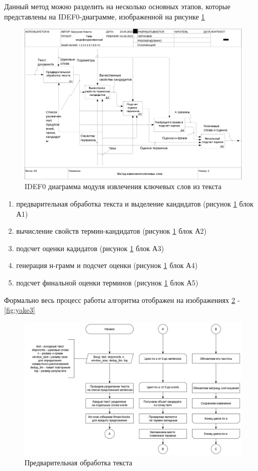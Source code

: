 Данный метод можно разделить на несколько основных этапов, которые представлены на IDEF0-диаграмме, изображенной на рисунке \ref{fig:02a0}
\begin{figure}[!h]
	\centering
	\includegraphics[width=1\linewidth]{src/img/idef0/Yake/02_A0}
	\caption{IDEF0 диаграмма модуля извлечения ключевых слов из текста}
	\label{fig:02a0}
\end{figure}

\begin{enumerate}
	\item предварительная обработка текста и выделение кандидатов (рисунок \ref{fig:02a0} блок А1)
	\item вычисление свойств термин-кандидатов (рисунок \ref{fig:02a0} блок А2)
	\item подсчет оценки кадидатов (рисунок \ref{fig:02a0} блок А3)
	\item генерация н-грамм и подсчет оценки (рисунок \ref{fig:02a0} блок А4)
	\item подсчет финальной оценки терминов (рисунок \ref{fig:02a0} блок А5)
\end{enumerate}

Формально весь процесс работы алгоритма отображен на изображениях \ref{fig:yake1} - \ref{fig:yake3}
\begin{figure}[!h]
	\centering
	\includegraphics[width=0.7\linewidth]{src/img/design/yake_1}
	\caption{Предварительная обработка текста}
	\label{fig:yake1}
\end{figure}

